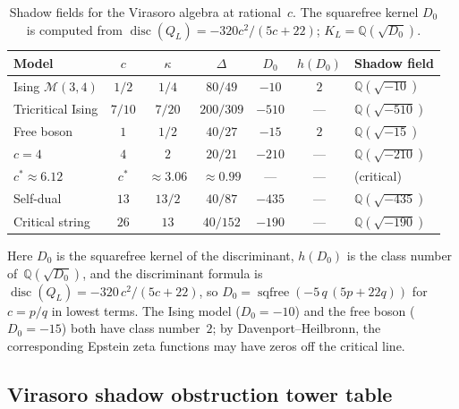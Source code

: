 \begin{table}[ht]
\centering
\caption{Shadow fields for the Virasoro algebra at rational~$c$.
The squarefree kernel $D_0$ is computed from
$\operatorname{disc}(Q_L) = -320c^2/(5c+22)$;
$K_L = \mathbb{Q}(\sqrt{D_0})$.}
\label{tab:shadow-fields-vir}
\renewcommand{\arraystretch}{1.35}
{\small
\begin{tabular}{lcccccl}
\toprule
\textbf{Model} & $c$ & $\kappa$ & $\Delta$
 & $D_0$
 & $h(D_0)$
 & \textbf{Shadow field} \\
\midrule
Ising $\mathcal{M}(3,4)$ & $1/2$ & $1/4$ & $80/49$
 & $-10$ & $2$
 & $\mathbb{Q}(\sqrt{-10})$ \\
Tricritical Ising & $7/10$ & $7/20$ & $200/309$
 & $-510$ & ---
 & $\mathbb{Q}(\sqrt{-510})$ \\
Free boson & $1$ & $1/2$ & $40/27$
 & $-15$ & $2$
 & $\mathbb{Q}(\sqrt{-15})$ \\
$c = 4$ & $4$ & $2$ & $20/21$
 & $-210$ & ---
 & $\mathbb{Q}(\sqrt{-210})$ \\
$c^* \approx 6.12$ & $c^*$ & $\approx 3.06$ & $\approx 0.99$
 & --- & ---
 & (critical) \\
Self-dual & $13$ & $13/2$ & $40/87$
 & $-435$ & ---
 & $\mathbb{Q}(\sqrt{-435})$ \\
Critical string & $26$ & $13$ & $40/152$
 & $-190$ & ---
 & $\mathbb{Q}(\sqrt{-190})$ \\
\bottomrule
\end{tabular}
}
\end{table}

\noindent
Here $D_0$ is the squarefree kernel of the discriminant,
$h(D_0)$ is the class number of~$\mathbb{Q}(\sqrt{D_0})$,
and the discriminant formula is
$\operatorname{disc}(Q_L) = -320\,c^2/(5c+22)$, so
$D_0 = \operatorname{sqfree}(-5\,q\,(5p + 22q))$ for
$c = p/q$ in lowest terms. The Ising model ($D_0 = -10$)
and the free boson ($D_0 = -15$) both have class number~$2$;
by Davenport--Heilbronn, the corresponding Epstein zeta
functions may have zeros off the critical line.


\subsection{Virasoro shadow obstruction tower table}\label{ssec:virasoro-tower-table}

